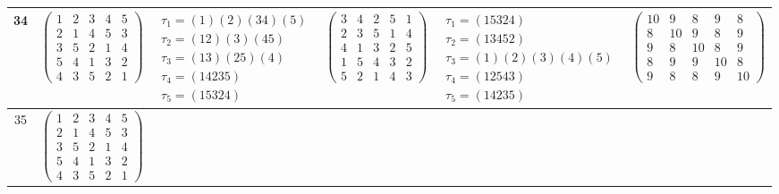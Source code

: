 \begin{longtable}{|c|p{2.7cm}|p{2.7cm}|p{2.7cm}|p{2.7cm}|p{3.3cm}|}
    \hline
    34                                                                                                                                          &
    $\begin{pmatrix}1&2&3&4&5\\2&1&4&5&3\\3&5&2&1&4\\5&4&1&3&2\\4&3&5&2&1\end{pmatrix}$                                                         &
    $\begin{array}{l}\tau_{1}=(1)(2)(34)(5)\\ \tau_{2}=(12)(3)(45)\\ \tau_{3}=(13)(25)(4)\\ \tau_{4}=(14235)\\ \tau_{5}=(15324)\end{array}$     &
    $\begin{pmatrix}3&4&2&5&1\\2&3&5&1&4\\4&1&3&2&5\\1&5&4&3&2\\5&2&1&4&3\end{pmatrix}$                                                         &
    $\begin{array}{l}\tau_{1}=(15324)\\ \tau_{2}=(13452)\\ \tau_{3}=(1)(2)(3)(4)(5)\\ \tau_{4}=(12543)\\ \tau_{5}=(14235)\end{array}$           &
    $\begin{pmatrix}10&9&8&9&8\\8&10&9&8&9\\9&8&10&8&9\\8&9&9&10&8\\9&8&8&9&10\end{pmatrix}$                                                                                                                                \\
    \hline
    35                                                                                                                                          &
    $\begin{pmatrix}1&2&3&4&5\\2&1&4&5&3\\3&5&2&1&4\\5&4&1&3&2\\4&3&5&2&1\end{pmatrix}$                                                         &

\end{longtable}

